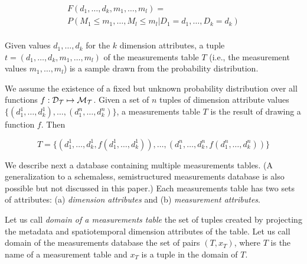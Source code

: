 \[ 
\begin{array}{l}
F(d_1, \ldots, d_k, m_1, \ldots, m_l) = \\
P(M_1 \leq m_1, \ldots, M_l \leq m_l | D_1 = d_1, \ldots, D_k = d_k) \\
\end{array}
\]

Given values $d_1,\ldots,d_k$ for the $k$ dimension attributes, a tuple $t=(d_1,\ldots,d_k,m_1,\ldots,m_l)$ of the measurements table $T$ (i.e., the measurement values $m_1, \ldots, m_l$) is a sample drawn from the probability distribution.  

 We assume the existence of a fixed but unknown probability distribution over all functions $f : {\cal D_T} \mapsto {\cal M_T}$. Given a set of $n$ tuples of dimension attribute values $\{(d_1^1,\ldots,d_k^1),\ldots,(d_1^n,\ldots,d_k^n)\}$, a measurements table $T$ is the result of drawing a function $f$. Then

\[
T =  \{(d_1^1,\ldots,d_k^1, f(d_1^1,\ldots,d_k^1)),\ldots,(d_1^n,\ldots,d_k^n,f(d_1^n,\ldots,d_k^n))\}
\]



We describe next a database containing multiple measurements tables. (A generalization to a schemaless, semistructured measurements database is also possible but not discussed in this paper.) Each measurements table has two sets of attributes: (a) {\em dimension attributes} and (b) {\em measurement attributes}. 

Let us call {\em domain of a measurements table} the set of tuples created by projecting  the metadata and spatiotemporal dimension attributes of the table. Let us call domain of the measurements database the set of pairs $(T, x_T)$, where $T$ is the name of a measurement table and $x_T$ is a tuple in the domain of $T$.


